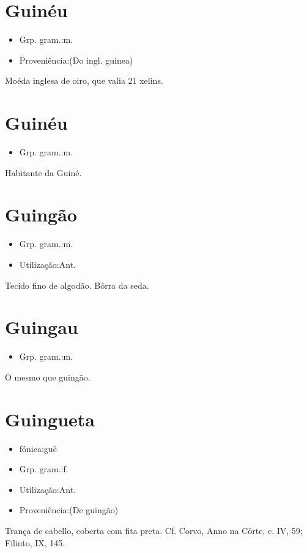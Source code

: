 \section{Guinéu}
\begin{itemize}
\item {Grp. gram.:m.}
\end{itemize}
\begin{itemize}
\item {Proveniência:(Do ingl. \textunderscore guinea\textunderscore )}
\end{itemize}
Moéda inglesa de oiro, que valia 21 xelins.
\section{Guinéu}
\begin{itemize}
\item {Grp. gram.:m.}
\end{itemize}
Habitante da Guiné.
\section{Guingão}
\begin{itemize}
\item {Grp. gram.:m.}
\end{itemize}
\begin{itemize}
\item {Utilização:Ant.}
\end{itemize}
Tecido fino de algodão.
Bôrra da seda.
\section{Guingau}
\begin{itemize}
\item {Grp. gram.:m.}
\end{itemize}
O mesmo que \textunderscore guingão\textunderscore .
\section{Guingueta}
\begin{itemize}
\item {fónica:guê}
\end{itemize}
\begin{itemize}
\item {Grp. gram.:f.}
\end{itemize}
\begin{itemize}
\item {Utilização:Ant.}
\end{itemize}
\begin{itemize}
\item {Proveniência:(De \textunderscore guingão\textunderscore )}
\end{itemize}
Trança de cabello, coberta com fita preta. Cf. Corvo, \textunderscore Anno na Côrte\textunderscore , c. IV, 59; Filinto, IX, 145.
